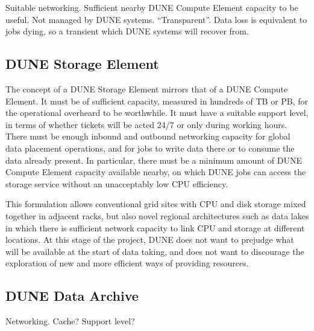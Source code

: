 Suitable networking. Sufficient nearby DUNE Compute Element capacity to be useful. Not managed by DUNE systems. ``Transparent''. Data loss is equivalent to jobs dying, so a transient which DUNE systems will recover from.

\subsection{DUNE Storage Element}
\label{sec:cm:dse}

The concept of a DUNE Storage Element mirrors that of a DUNE Compute Element. It must be of sufficient capacity, measured in hundreds of TB or PB, for the operational overheard to be worthwhile. It must have a suitable support level, in terms of whether tickets will be acted 24/7 or only during working hours. There must be enough inbound and outbound networking capacity for global data placement operations, and for jobs to write data there or to consume the data already present. In particular, there must be a minimum amount of DUNE Compute Element capacity available nearby, on which DUNE jobs can access the storage service without an unacceptably low CPU efficiency. 

This formulation allows conventional grid sites with CPU and disk storage mixed together in adjacent racks, but also novel regional architectures such as data lakes in which there is sufficient network capacity to link CPU and storage at different locations. At this stage of the project, DUNE does not want to prejudge what will be available at the start of data taking, and does not want to discourage the exploration of new and more efficient ways of providing resources.

\subsection{DUNE Data Archive}

Networking. Cache? Support level?

